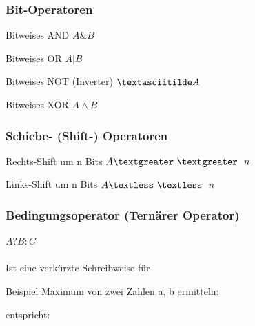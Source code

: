 				\hspace*{0.5cm}
				\begin{minipage}[t]{9 cm}
					\subsubsection{Bit-Operatoren}
						\begin{compactitem}
							\item Bitweises AND $A \& B$
							\item Bitweises OR $A | B$
							\item Bitweises NOT (Inverter) $\textasciitilde A$
							\item Bitweises XOR $A \wedge B$ 
						\end{compactitem}	
				\end{minipage}
				
				\subsubsection{Schiebe- (Shift-) Operatoren}
					\begin{compactitem}
						\item Rechts-Shift um n Bits $A \textgreater \ \textgreater \ \ n$
						\item Links-Shift um n Bits $A \textless \  \textless \ \ n$
					\end{compactitem}
										
				\begin{minipage}[t]{9 cm}
					\subsubsection{Bedingungsoperator (Ternärer Operator)}
						$A ? B : C$\\\\
						Ist eine verkürzte Schreibweise für
						
				\end{minipage}
				\hspace*{0.5cm}
				\begin{minipage}[t]{9 cm}
					
						\vspace*{0.5cm}
						Beispiel Maximum von zwei Zahlen a, b ermitteln:
						
						entspricht:
							
				\end{minipage}
